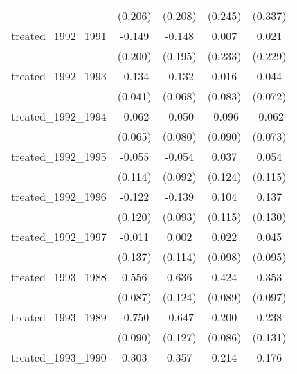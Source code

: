 {\begin{tabular}{l*{4}{c}}
            &     (0.206)         &     (0.208)         &     (0.245)         &     (0.337)         \\
[1em]
treated\_1992\_1991&      -0.149         &      -0.148         &       0.007         &       0.021         \\
            &     (0.200)         &     (0.195)         &     (0.233)         &     (0.229)         \\
[1em]
treated\_1992\_1993&      -0.134\sym{**} &      -0.132         &       0.016         &       0.044         \\
            &     (0.041)         &     (0.068)         &     (0.083)         &     (0.072)         \\
[1em]
treated\_1992\_1994&      -0.062         &      -0.050         &      -0.096         &      -0.062         \\
            &     (0.065)         &     (0.080)         &     (0.090)         &     (0.073)         \\
[1em]
treated\_1992\_1995&      -0.055         &      -0.054         &       0.037         &       0.054         \\
            &     (0.114)         &     (0.092)         &     (0.124)         &     (0.115)         \\
[1em]
treated\_1992\_1996&      -0.122         &      -0.139         &       0.104         &       0.137         \\
            &     (0.120)         &     (0.093)         &     (0.115)         &     (0.130)         \\
[1em]
treated\_1992\_1997&      -0.011         &       0.002         &       0.022         &       0.045         \\
            &     (0.137)         &     (0.114)         &     (0.098)         &     (0.095)         \\
[1em]
treated\_1993\_1988&       0.556\sym{***}&       0.636\sym{***}&       0.424\sym{***}&       0.353\sym{***}\\
            &     (0.087)         &     (0.124)         &     (0.089)         &     (0.097)         \\
[1em]
treated\_1993\_1989&      -0.750\sym{***}&      -0.647\sym{***}&       0.200\sym{*}  &       0.238         \\
            &     (0.090)         &     (0.127)         &     (0.086)         &     (0.131)         \\
[1em]
treated\_1993\_1990&       0.303\sym{***}&       0.357\sym{***}&       0.214\sym{***}&       0.176\sym{*}  \\

\end{tabular}}
